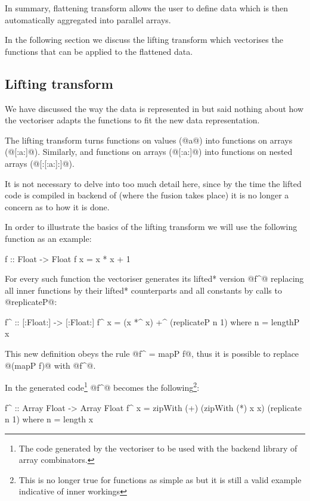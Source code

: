 \documentclass[preamble.tex]{subfiles}
\begin{document}
In summary, flattening transform allows the user to define data which is then automatically aggregated into parallel arrays.

In the following section we discuss the lifting transform which vectorises the functions that can be applied to the flattened data.


\subsection{Lifting transform}
\label{sec:Lifting}

We have discussed the way the data is represented in \DPH but said nothing about how the vectoriser adapts the functions to fit the new data representation.

The lifting transform turns functions on values (@a@) into functions on arrays (@[:a:]@). Similarly, and functions on arrays (@[:a:]@) into functions on nested arrays (@[:[:a:]:]@).

It is not necessary to delve into too much detail here, since by the time the lifted code is compiled in backend of \DPH (where the fusion takes place) it is no longer a concern as to how it is done.

In order to illustrate the basics of the lifting transform we will use the following function as an example:

\begin{hscode}
f :: Float -> Float
f x = x * x + 1
\end{hscode}

For every such function the vectoriser generates its \*lifted* version @f^@ replacing all inner functions by their \*lifted* counterparts and all constants by calls to @replicateP@:

\begin{hscode}[literate={^}{{$^\uparrow$}}1]
f^ :: [:Float:] -> [:Float:]
f^ x = (x *^ x) +^ (replicateP n 1)
  where n = lengthP x
\end{hscode}

This new definition obeys the rule @f^ = mapP f@, thus it is possible to replace @(mapP f)@ with @f^@.

In the generated code\footnote{The code generated by the vectoriser to be used with the backend library of array combinators.} @f^@ becomes the following\footnote{This is no longer true for functions as simple as  \cite{vectavoid} but it is still a valid example indicative of \DPH inner workings }:

\begin{hscode}[literate={^}{{$^\uparrow$}}1]
f^ :: Array Float -> Array Float
f^ x = zipWith (+) (zipWith (*) x x)
                   (replicate n 1)
  where n = length x
\end{hscode}
\end{document}
